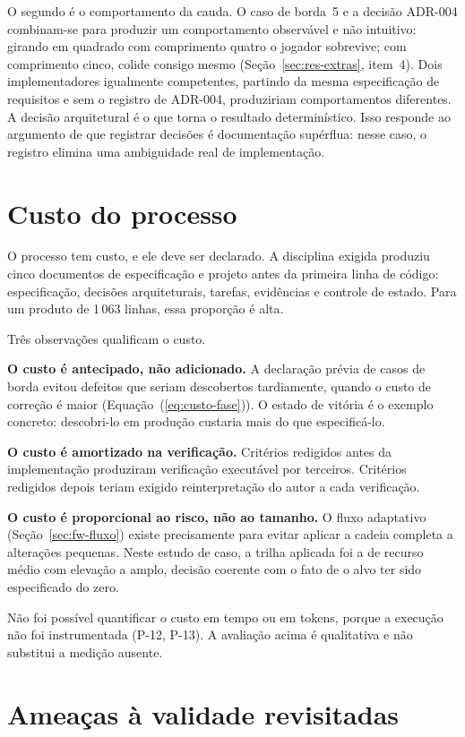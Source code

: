 O segundo é o comportamento da cauda. O caso de borda~5 e a decisão ADR-004
combinam-se para produzir um comportamento observável e não intuitivo: girando
em quadrado com comprimento quatro o jogador sobrevive; com comprimento cinco,
colide consigo mesmo (Seção~\ref{sec:res-extras}, item~4). Dois implementadores
igualmente competentes, partindo da mesma especificação de requisitos e sem o
registro de ADR-004, produziriam comportamentos diferentes. A decisão
arquitetural é o que torna o resultado determinístico. Isso responde ao argumento
de que registrar decisões é documentação supérflua: nesse caso, o registro
elimina uma ambiguidade real de implementação.

\section{Custo do processo}
\label{sec:disc-custo}

O processo tem custo, e ele deve ser declarado. A disciplina exigida produziu
cinco documentos de especificação e projeto antes da primeira linha de código:
especificação, decisões arquiteturais, tarefas, evidências e controle de estado.
Para um produto de 1\,063 linhas, essa proporção é alta.

Três observações qualificam o custo.

\textbf{O custo é antecipado, não adicionado.} A declaração prévia de casos de
borda evitou defeitos que seriam descobertos tardiamente, quando o custo de
correção é maior (Equação~(\ref{eq:custo-fase})). O estado de vitória é o exemplo
concreto: descobri-lo em produção custaria mais do que especificá-lo.

\textbf{O custo é amortizado na verificação.} Critérios redigidos antes da
implementação produziram verificação executável por terceiros. Critérios
redigidos depois teriam exigido reinterpretação do autor a cada verificação.

\textbf{O custo é proporcional ao risco, não ao tamanho.} O fluxo adaptativo
(Seção~\ref{sec:fw-fluxo}) existe precisamente para evitar aplicar a cadeia
completa a alterações pequenas. Neste estudo de caso, a trilha aplicada foi a de
recurso médio com elevação a amplo, decisão coerente com o fato de o alvo ter
sido especificado do zero.

Não foi possível quantificar o custo em tempo ou em tokens, porque a execução não
foi instrumentada (P-12, P-13). A avaliação acima é qualitativa e não substitui a
medição ausente.

\section{Ameaças à validade revisitadas}
\label{sec:disc-ameacas}

